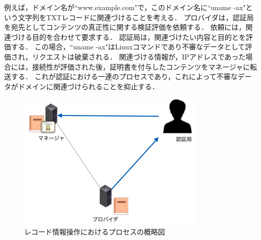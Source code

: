 例えば，ドメイン名が``www.example.com"で，このドメイン名に``uname -ax"という文字列をTXTレコードに関連づけることを考える．
プロバイダは，認証局を宛先としてコンテンツの真正性に関する検証評価を依頼する．
依頼には，関連づける目的を合わせて要求する．
認証局は，関連づけたい内容と目的とを評価する．
この場合，``uname -ax"はLinuxコマンドであり不審なデータとして評価され，リクエストは破棄される．
関連づける情報が，IPアドレスであった場合には，接続性が評価された後，証明書を付与したコンテンツをマネージャに転送する．
これが認証における一連のプロセスであり，これによって不審なデータがドメインに関連づけられることを抑止する．
\begin{figure}[h]
 \centering
 \includegraphics[scale=0.7]{figure/certificate-procedure.png}
 \caption{レコード情報操作におけるプロセスの概略図}
 \label{fig:manager-provider}
\end{figure}


\newpage
